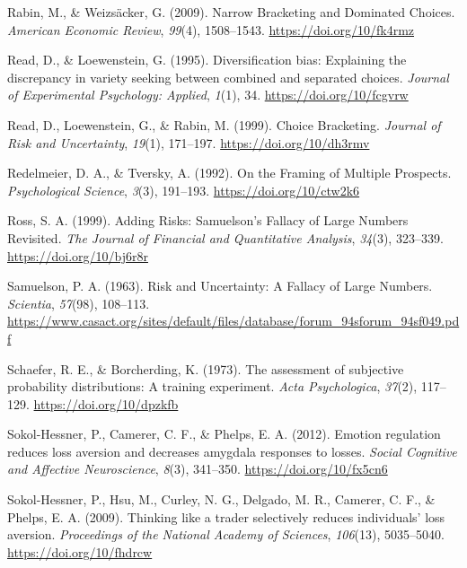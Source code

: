 \documentclass[
  english,
  man, donotrepeattitle,floatsintext]{apa7}
\newlength{\cslhangindent}
\newenvironment{cslreferences}%
  {\setlength{\parindent}{0pt}%
  \everypar{\setlength{\hangindent}{\cslhangindent}}\ignorespaces}%
  {\par}
\theoremstyle{definition}
\theoremstyle{definition}
\theoremstyle{definition}
\theoremstyle{definition}
\theoremstyle{remark}
\begin{document}
\begin{cslreferences}
\leavevmode\hypertarget{ref-rabin2009}{}%
Rabin, M., \& Weizsäcker, G. (2009). Narrow Bracketing and Dominated Choices. \emph{American Economic Review}, \emph{99}(4), 1508--1543. \url{https://doi.org/10/fk4rmz}

\leavevmode\hypertarget{ref-read1995}{}%
Read, D., \& Loewenstein, G. (1995). Diversification bias: Explaining the discrepancy in variety seeking between combined and separated choices. \emph{Journal of Experimental Psychology: Applied}, \emph{1}(1), 34. \url{https://doi.org/10/fcgvrw}

\leavevmode\hypertarget{ref-read1999}{}%
Read, D., Loewenstein, G., \& Rabin, M. (1999). Choice Bracketing. \emph{Journal of Risk and Uncertainty}, \emph{19}(1), 171--197. \url{https://doi.org/10/dh3rmv}

\leavevmode\hypertarget{ref-redelmeier1992}{}%
Redelmeier, D. A., \& Tversky, A. (1992). On the Framing of Multiple Prospects. \emph{Psychological Science}, \emph{3}(3), 191--193. \url{https://doi.org/10/ctw2k6}

\leavevmode\hypertarget{ref-ross1999}{}%
Ross, S. A. (1999). Adding Risks: Samuelson's Fallacy of Large Numbers Revisited. \emph{The Journal of Financial and Quantitative Analysis}, \emph{34}(3), 323--339. \url{https://doi.org/10/bj6r8r}

\leavevmode\hypertarget{ref-samuelson1963}{}%
Samuelson, P. A. (1963). Risk and Uncertainty: A Fallacy of Large Numbers. \emph{Scientia}, \emph{57}(98), 108--113. \url{https://www.casact.org/sites/default/files/database/forum_94sforum_94sf049.pdf}

\leavevmode\hypertarget{ref-schaefer1973}{}%
Schaefer, R. E., \& Borcherding, K. (1973). The assessment of subjective probability distributions: A training experiment. \emph{Acta Psychologica}, \emph{37}(2), 117--129. \url{https://doi.org/10/dpzkfb}

\leavevmode\hypertarget{ref-sokolhessner2012}{}%
Sokol-Hessner, P., Camerer, C. F., \& Phelps, E. A. (2012). Emotion regulation reduces loss aversion and decreases amygdala responses to losses. \emph{Social Cognitive and Affective Neuroscience}, \emph{8}(3), 341--350. \url{https://doi.org/10/fx5cn6}

\leavevmode\hypertarget{ref-sokolhessner2009}{}%
Sokol-Hessner, P., Hsu, M., Curley, N. G., Delgado, M. R., Camerer, C. F., \& Phelps, E. A. (2009). Thinking like a trader selectively reduces individuals' loss aversion. \emph{Proceedings of the National Academy of Sciences}, \emph{106}(13), 5035--5040. \url{https://doi.org/10/fhdrcw}


\end{cslreferences}
\end{document}
